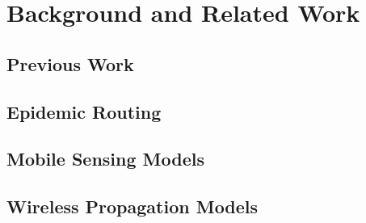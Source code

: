 \chapter{Background and Related Work}\label{background}



\section{Previous Work}\label{background_previous_work}
\section{Epidemic Routing}\label{background_epidemic_routing}

\section{Mobile Sensing Models}\label{background_mobile_sensing_models}
\section{Wireless Propagation Models}

